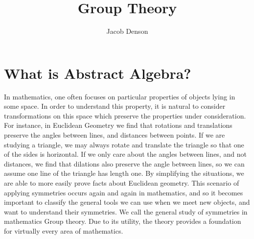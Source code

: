 

\title{Group Theory}
\author{Jacob Denson}



\maketitle
\tableofcontents
{}

\chapter{What is Abstract Algebra?}

In mathematics, one often focuses on particular properties of objects lying in some space. In order to understand this property, it is natural to consider transformations on this space which preserve the properties under consideration. For instance, in Euclidean Geometry we find that rotations and translations preserve the angles between lines, and distances between points. If we are studying a triangle, we may always rotate and translate the triangle so that one of the sides is horizontal. If we only care about the angles between lines, and not distances, we find that dilations also preserve the angle between lines, so we can assume one line of the triangle has length one. By simplifying the situations, we are able to more easily prove facts about Euclidean geometry. This scenario of applying symmetries occurs again and again in mathematics, and so it becomes important to classify the general tools we can use when we meet new objects, and want to understand their symmetries. We call the general study of symmetries in mathematics Group theory. Due to its utility, the theory provides a foundation for virtually every area of mathematics.

